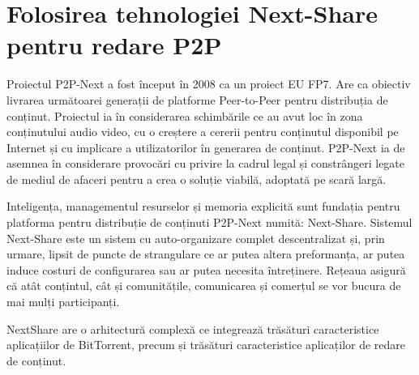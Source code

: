 \section{Folosirea tehnologiei Next-Share pentru redare P2P}
\label{sec:multimedia-dist:nextshare}

Proiectul P2P-Next a fost început în 2008 ca un proiect EU FP7. Are ca obiectiv
livrarea următoarei generații de platforme Peer-to-Peer pentru distribuția de
conținut. Proiectul ia în considerarea schimbările ce au avut loc în zona
conținutului audio video, cu o creștere a cererii pentru conținutul disponibil
pe Internet și cu implicare a utilizatorilor în generarea de conținut.
P2P-Next ia de asemnea în considerare provocări cu privire la cadrul legal și
constrângeri legate de mediul de afaceri pentru a crea o soluție viabilă,
adoptată pe scară largă.

Inteligența, managementul resurselor și memoria explicită sunt fundația pentru
platforma pentru distribuție de conținuti P2P-Next numită: Next-Share. Sistemul
Next-Share este un sistem cu auto-organizare complet descentralizat și, prin
urmare, lipsit de puncte de strangulare ce ar putea altera preformanța, ar
putea induce costuri de configurarea sau ar putea necesita întreținere.
Rețeaua asigură că atât conțintul, cât și comunitățile, comunicarea și
comerțul se vor bucura de mai mulți participanți.

NextShare are o arhitectură complexă ce integrează trăsături caracteristice
aplicațiilor de BitTorrent, precum și trăsături caracteristice aplicaților de
redare de conținut.


